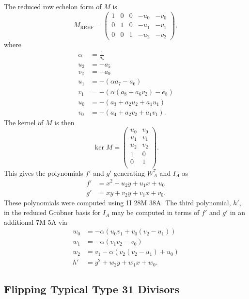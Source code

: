 The reduced row echelon form of $M$ is
\[ M_{\text{RREF}} = \begin{pmatrix}
  1 & 0 & 0 & -u_0 & -v_0 \\
  0 & 1 & 0 & -u_1 & -v_1 \\
  0 & 0 & 1 & -u_2 & -v_2
\end{pmatrix}, \]
where
\begin{align*}
  \alpha &= \frac 1 {a_5} \\
  u_2 &= -a_5 \\
  v_2 &= -a_9 \\
  u_1 &= -(\alpha a_7 - a_6) \\
  v_1 &= -(\alpha(a_8 + a_6v_2) - e_8) \\
  u_0 &= -(a_3 + a_2u_2 + a_1u_1) \\
  v_0 &= -(a_4 + a_2v_2 + a_1v_1).
\end{align*}
The kernel of $M$ is then
\[ \ker M = \begin{pmatrix}
  u_0 & v_0 \\
  u_1 & v_1 \\
  u_2 & v_2 \\
    1 & 0 \\
    0 & 1 \\
\end{pmatrix}. \]
This gives the polynomials $f'$ and $g'$ generating $W_A^7$ and $I_A$ as
\begin{align*}
  f' &= x^2 + u_2y + u_1x + u_0 \\
  g' &= xy  + v_2y + v_1x + v_0.
\end{align*}
These polynomials were computed using 1I 28M 38A.
The third polynomial, $h'$, in the reduced Gr\"obner basis for $I_A$ may be computed in terms of $f'$ and $g'$ in an additional 7M 5A via
\begin{align*}
  w_0 &= -\alpha(u_0v_1 + v_0(v_2 - u_1)) \\
  w_1 &= -\alpha(v_1v_2 - v_0) \\
  w_2 &= v_1 - \alpha(v_2(v_2 - u_1) + u_0) \\
  h' &= y^2 + w_2y + w_1x + w_0.
\end{align*}




\subsection{Flipping Typical Type 31 Divisors}

